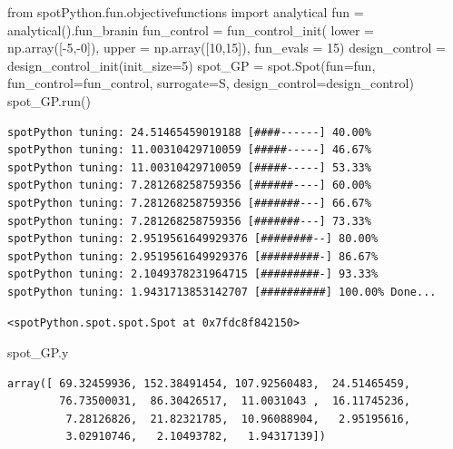 \documentclass[
  letterpaper,
  DIV=11,
  numbers=noendperiod]{scrreprt}
\newenvironment{Shaded}{\begin{snugshade}}{\end{snugshade}}
\newcommand{\DecValTok}[1]{\textcolor[rgb]{0.68,0.00,0.00}{#1}}
\newcommand{\ImportTok}[1]{\textcolor[rgb]{0.00,0.46,0.62}{#1}}
\newcommand{\NormalTok}[1]{\textcolor[rgb]{0.00,0.23,0.31}{#1}}
\newcommand{\OperatorTok}[1]{\textcolor[rgb]{0.37,0.37,0.37}{#1}}
\begin{document}
\begin{Shaded}
\begin{Highlighting}[]
\ImportTok{from}\NormalTok{ spotPython.fun.objectivefunctions }\ImportTok{import}\NormalTok{ analytical}
\NormalTok{fun }\OperatorTok{=}\NormalTok{ analytical().fun\_branin}
\NormalTok{fun\_control }\OperatorTok{=}\NormalTok{ fun\_control\_init(}
\NormalTok{    lower }\OperatorTok{=}\NormalTok{ np.array([}\OperatorTok{{-}}\DecValTok{5}\NormalTok{,}\OperatorTok{{-}}\DecValTok{0}\NormalTok{]),}
\NormalTok{    upper }\OperatorTok{=}\NormalTok{ np.array([}\DecValTok{10}\NormalTok{,}\DecValTok{15}\NormalTok{]),}
\NormalTok{    fun\_evals }\OperatorTok{=} \DecValTok{15}\NormalTok{)    }
\NormalTok{design\_control }\OperatorTok{=}\NormalTok{ design\_control\_init(init\_size}\OperatorTok{=}\DecValTok{5}\NormalTok{)}
\NormalTok{spot\_GP }\OperatorTok{=}\NormalTok{ spot.Spot(fun}\OperatorTok{=}\NormalTok{fun, }
\NormalTok{                    fun\_control}\OperatorTok{=}\NormalTok{fun\_control,}
\NormalTok{                    surrogate}\OperatorTok{=}\NormalTok{S, }
\NormalTok{                    design\_control}\OperatorTok{=}\NormalTok{design\_control)}
\NormalTok{spot\_GP.run()}
\end{Highlighting}
\end{Shaded}

\begin{verbatim}
spotPython tuning: 24.51465459019188 [####------] 40.00% 
spotPython tuning: 11.00310429710059 [#####-----] 46.67% 
spotPython tuning: 11.00310429710059 [#####-----] 53.33% 
spotPython tuning: 7.281268258759356 [######----] 60.00% 
spotPython tuning: 7.281268258759356 [#######---] 66.67% 
spotPython tuning: 7.281268258759356 [#######---] 73.33% 
spotPython tuning: 2.9519561649929376 [########--] 80.00% 
spotPython tuning: 2.9519561649929376 [#########-] 86.67% 
spotPython tuning: 2.1049378231964715 [#########-] 93.33% 
spotPython tuning: 1.9431713853142707 [##########] 100.00% Done...
\end{verbatim}

\begin{verbatim}
<spotPython.spot.spot.Spot at 0x7fdc8f842150>
\end{verbatim}

\begin{Shaded}
\begin{Highlighting}[]
\NormalTok{spot\_GP.y}
\end{Highlighting}
\end{Shaded}

\begin{verbatim}
array([ 69.32459936, 152.38491454, 107.92560483,  24.51465459,
        76.73500031,  86.30426517,  11.0031043 ,  16.11745236,
         7.28126826,  21.82321785,  10.96088904,   2.95195616,
         3.02910746,   2.10493782,   1.94317139])
\end{verbatim}
\end{document}
